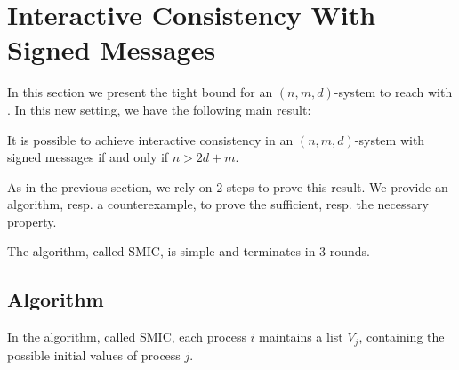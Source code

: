 
\section{Interactive Consistency With Signed Messages}\label{signedMessage}

In this section we present the tight bound for an $( n,m,d )$-system to
reach  with . In this new setting,
we have the following main result:

\begin{theorem}
  \label{consensusSigned} It is possible to achieve  interactive consistency
  in an $( n,m,d )$-system with signed messages  if and only if $n> 2d+m$.
\end{theorem}

As in the previous section, we rely on $2$ steps to prove this result.  We provide an algorithm, resp. a counterexample,  to prove  the sufficient, resp. the necessary property. 

The algorithm, called SMIC, is simple  and terminates in 3 rounds.


\subsection{Algorithm}
In the algorithm, called SMIC, each process $i$ maintains a list $V_{j}$, containing the possible initial values of process $j$.
{}

